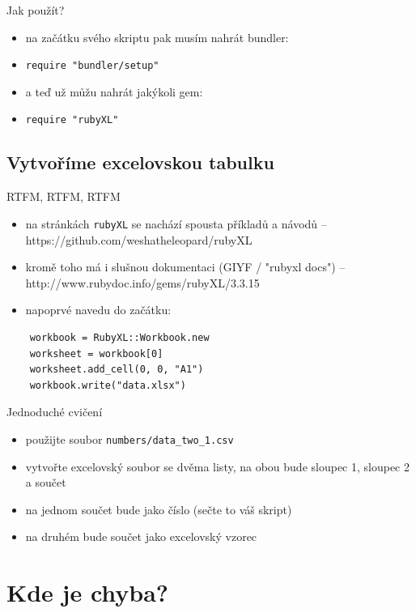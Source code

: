 \documentclass{beamer}
\begin{document}
\begin{frame}{Jak použít?}
  \begin{itemize}
    \item na začátku svého skriptu pak musím nahrát bundler:
    \item \texttt{require "bundler/setup"}
    \item a teď už můžu nahrát jakýkoli gem:
    \item \texttt{require "rubyXL"}
  \end{itemize}
\end{frame}

\subsection{Vytvoříme excelovskou tabulku}

\begin{frame}[fragile]{RTFM, RTFM, RTFM}
  \begin{itemize}
    \item na stránkách \texttt{rubyXL} se nachází spousta příkladů a návodů -- https://github.com/weshatheleopard/rubyXL
    \item kromě toho má i slušnou dokumentaci (GIYF / "rubyxl docs") -- http://www.rubydoc.info/gems/rubyXL/3.3.15
    \item napoprvé navedu do začátku:
  \end{itemize}
  {\scriptsize
  \begin{verbatim}
    workbook = RubyXL::Workbook.new
    worksheet = workbook[0]
    worksheet.add_cell(0, 0, "A1")
    workbook.write("data.xlsx")
  \end{verbatim}
  }
\end{frame}

\begin{frame}{Jednoduché cvičení}
  \begin{itemize}
    \item použijte soubor \texttt{numbers/data\_two\_1.csv}
    \item vytvořte excelovský soubor se dvěma listy, na obou bude sloupec 1, sloupec 2 a součet
    \item na jednom součet bude jako číslo (sečte to váš skript)
    \item na druhém bude součet jako excelovský vzorec
  \end{itemize}
\end{frame}


\section{Kde je chyba?}
\end{document}
